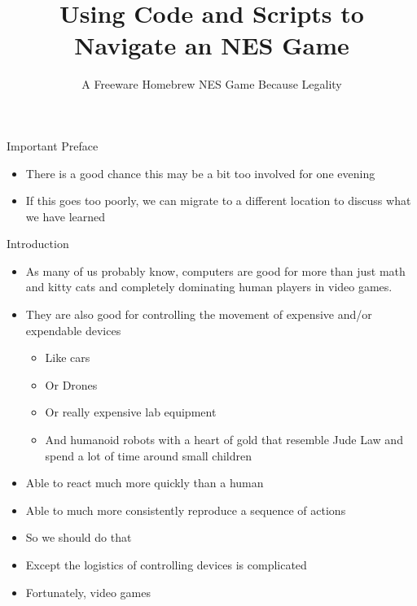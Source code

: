 \documentclass{beamer}
\title[]{Using Code and Scripts to Navigate an NES Game}
\subtitle{A Freeware Homebrew NES Game Because Legality}
\author[]{}
\institute{Coding Dojo}
\date{}
\begin{document}
\begin{frame}
	\titlepage
\end{frame}

\begin{frame}{Important Preface}
	\begin{itemize}
		\item There is a good chance this may be a bit too involved for one evening
		\item If this goes too poorly, we can migrate to a different location to discuss what we have learned
	\end{itemize}
\end{frame}

\begin{frame}{Introduction}
	\begin{itemize}
		\item As many of us probably know, computers are good for more than just math and kitty cats and completely dominating human players in video games.
		\item They are also good for controlling the movement of expensive and/or expendable devices
		\begin{itemize}
			\item Like cars
			\item Or Drones
			\item Or really expensive lab equipment
			\item And humanoid robots with a heart of gold that resemble Jude Law and spend a lot of time around small children
		\end{itemize}
		\item Able to react much more quickly than a human
		\item Able to much more consistently reproduce a sequence of actions
	\end{itemize}
\end{frame}

\begin{frame}{}
	\begin{itemize}
		\item So we should do that
		\item Except the logistics of controlling devices is complicated
		\item Fortunately, video games
	\end{itemize}
\end{frame}
\end{document}

